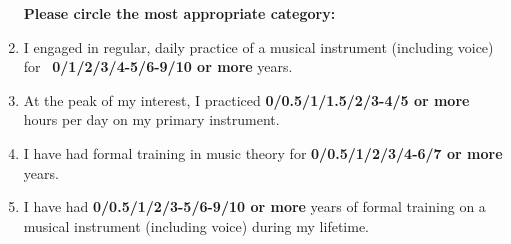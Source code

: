 \documentclass[12pt, a4paper]{article}
\begin{document}
\begin{enumerate}
\vspace{12pt}
\textbf{Please circle the most appropriate category:}
\item I engaged in regular, daily practice of a musical instrument (including voice) for \
\newline\textbf{0\hspace{2pt}/\hspace{2pt}1\hspace{2pt}/\hspace{2pt}2\hspace{2pt}/\hspace{2pt}3\hspace{2pt}/\hspace{2pt}4-5\hspace{2pt}/\hspace{2pt}6-9\hspace{2pt}/\hspace{2pt}10 or more} years.
\item At the peak of my interest, I practiced \textbf{0\hspace{2pt}/\hspace{2pt}0.5\hspace{2pt}/\hspace{2pt}1\hspace{2pt}/\hspace{2pt}1.5\hspace{2pt}/\hspace{2pt}2\hspace{2pt}/\hspace{2pt}3-4\hspace{2pt}/\hspace{2pt}5 or more}
hours per day on my primary instrument.
\item I have had formal training in music theory for \textbf{0\hspace{2pt}/\hspace{2pt}0.5\hspace{2pt}/\hspace{2pt}1\hspace{2pt}/\hspace{2pt}2\hspace{2pt}/\hspace{2pt}3\hspace{2pt}/\hspace{2pt}4-6\hspace{2pt}/\hspace{2pt}7 or more} years.
\item I have had \textbf{0\hspace{2pt}/\hspace{2pt}0.5\hspace{2pt}/\hspace{2pt}1\hspace{2pt}/\hspace{2pt}2\hspace{2pt}/\hspace{2pt}3-5\hspace{2pt}/\hspace{2pt}6-9\hspace{2pt}/\hspace{2pt}10 or more} years of formal training on a musical instrument (including voice) during my lifetime.

\end{enumerate}
\end{document}

